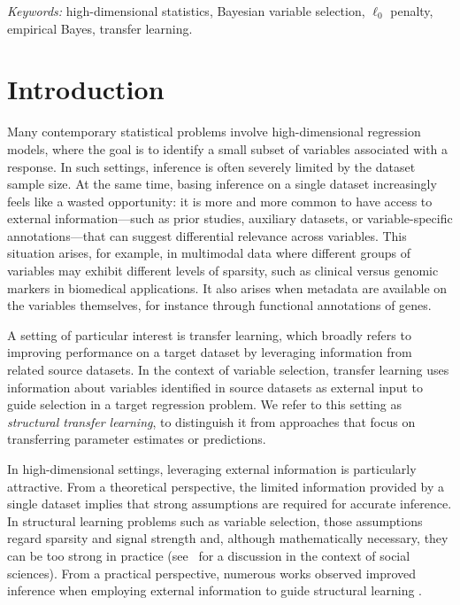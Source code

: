 \documentclass[
  12pt]{article}
\begin{document}
\noindent%
{\it Keywords:} high-dimensional statistics, Bayesian variable selection, $\ell_0$ penalty, empirical Bayes, transfer learning.
\vfill

\newpage
{} %


\maketitle

\section{Introduction}

Many contemporary statistical problems involve high-dimensional regression models, where the goal is to identify a small subset of variables associated with a response.
In such settings, inference is often severely limited by the dataset sample size.
At the same time, \color{green}basing inference on a single dataset increasingly feels like a wasted opportunity: \color{black}it is more and more common to have access to external information—such as prior studies, auxiliary datasets, or variable-specific annotations—that can suggest differential relevance across variables. This situation arises, for example, in multimodal data \citep{liang2023multimodal} where different groups of variables may exhibit different levels of sparsity, such as clinical versus genomic markers in biomedical applications.
It also arises when metadata are available on the variables themselves, for instance through functional annotations of genes.

A setting of particular interest is transfer learning, which broadly refers to improving performance on a target dataset by leveraging information from related source datasets.
In the context of variable selection, transfer learning uses information about variables identified in source datasets as external input to guide selection in a target regression problem.
We refer to this setting as \emph{structural transfer learning}, to distinguish it from approaches that focus on transferring parameter estimates or predictions.

In high-dimensional settings, leveraging external information is particularly attractive.
From a theoretical perspective, the limited information provided by a single dataset implies that strong assumptions are required for accurate inference. In structural learning problems such as variable selection, those assumptions regard sparsity and signal strength and, although mathematically necessary, they can be too strong in practice 
(see~\cite{giannone2021economic} for a discussion in the context of social sciences). From a practical perspective, numerous works observed improved inference when employing external information to guide structural learning \citep{stingo:2011, Boulesteix2017, chen_tinghuei:2021}. 
\end{document}
